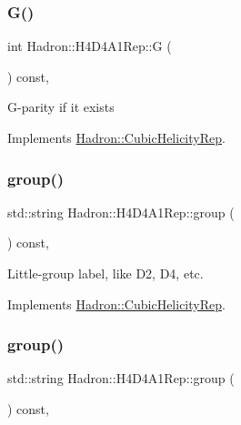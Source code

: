 \subsubsection{\texorpdfstring{G()}{G()}\hspace{0.1cm}{\footnotesize\ttfamily [3/3]}}
{\footnotesize\ttfamily int Hadron\+::\+H4\+D4\+A1\+Rep\+::G (\begin{DoxyParamCaption}{ }\end{DoxyParamCaption}) const\hspace{0.3cm}{\ttfamily [inline]}, {\ttfamily [virtual]}}

G-\/parity if it exists 

Implements \mbox{\hyperlink{structHadron_1_1CubicHelicityRep_a50689f42be1e6170aa8cf6ad0597018b}{Hadron\+::\+Cubic\+Helicity\+Rep}}.

\mbox{\label{structHadron_1_1H4D4A1Rep_a3402ac90043c637d96eeafff046ba3ed}} 
\subsubsection{\texorpdfstring{group()}{group()}\hspace{0.1cm}{\footnotesize\ttfamily [1/5]}}
{\footnotesize\ttfamily std\+::string Hadron\+::\+H4\+D4\+A1\+Rep\+::group (\begin{DoxyParamCaption}{ }\end{DoxyParamCaption}) const\hspace{0.3cm}{\ttfamily [inline]}, {\ttfamily [virtual]}}

Little-\/group label, like D2, D4, etc. 

Implements \mbox{\hyperlink{structHadron_1_1CubicHelicityRep_a101a7d76cd8ccdad0f272db44b766113}{Hadron\+::\+Cubic\+Helicity\+Rep}}.

\mbox{\label{structHadron_1_1H4D4A1Rep_a3402ac90043c637d96eeafff046ba3ed}} 
\subsubsection{\texorpdfstring{group()}{group()}\hspace{0.1cm}{\footnotesize\ttfamily [2/5]}}
{\footnotesize\ttfamily std\+::string Hadron\+::\+H4\+D4\+A1\+Rep\+::group (\begin{DoxyParamCaption}{ }\end{DoxyParamCaption}) const\hspace{0.3cm}{\ttfamily [inline]}, {\ttfamily [virtual]}}

